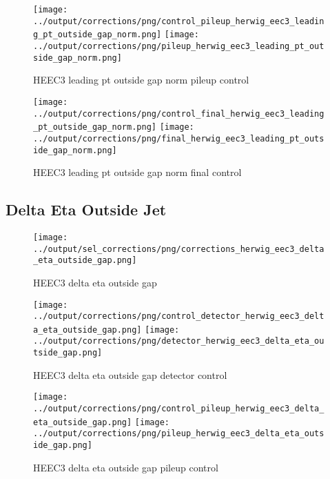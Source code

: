 \documentclass[11pt]{book}
\begin{document}
\begin{figure}[ht]
\centering
\texttt{[image: ../output/corrections/png/control\_pileup\_herwig\_eec3\_leading\_pt\_outside\_gap\_norm.png]}
\texttt{[image: ../output/corrections/png/pileup\_herwig\_eec3\_leading\_pt\_outside\_gap\_norm.png]}
\caption{HEEC3 leading pt outside gap norm pileup control}
\label{fig:HEEC3_leading_pt_outside_gap_norm_pileup_control}
\end{figure}


\begin{figure}[ht]
\centering
\texttt{[image: ../output/corrections/png/control\_final\_herwig\_eec3\_leading\_pt\_outside\_gap\_norm.png]}
\texttt{[image: ../output/corrections/png/final\_herwig\_eec3\_leading\_pt\_outside\_gap\_norm.png]}
\caption{HEEC3 leading pt outside gap norm final control}
\label{fig:HEEC3_leading_pt_outside_gap_norm_final_control}
\end{figure}


\clearpage
\subsection{Delta Eta Outside Jet}
\begin{figure}[ht]
\centering
\texttt{[image: ../output/sel\_corrections/png/corrections\_herwig\_eec3\_delta\_eta\_outside\_gap.png]}
\caption{HEEC3 delta eta outside gap}
\label{fig:HEEC3_delta_eta_outside_gap}
\end{figure}


\begin{figure}[ht]
\centering
\texttt{[image: ../output/corrections/png/control\_detector\_herwig\_eec3\_delta\_eta\_outside\_gap.png]}
\texttt{[image: ../output/corrections/png/detector\_herwig\_eec3\_delta\_eta\_outside\_gap.png]}
\caption{HEEC3 delta eta outside gap detector control}
\label{fig:HEEC3_delta_eta_outside_gap_detector_control}
\end{figure}

\begin{figure}[ht]
\centering
\texttt{[image: ../output/corrections/png/control\_pileup\_herwig\_eec3\_delta\_eta\_outside\_gap.png]}
\texttt{[image: ../output/corrections/png/pileup\_herwig\_eec3\_delta\_eta\_outside\_gap.png]}
\caption{HEEC3 delta eta outside gap pileup control}
\label{fig:HEEC3_delta_eta_outside_gap_pileup_control}
\end{figure}
\end{document}
